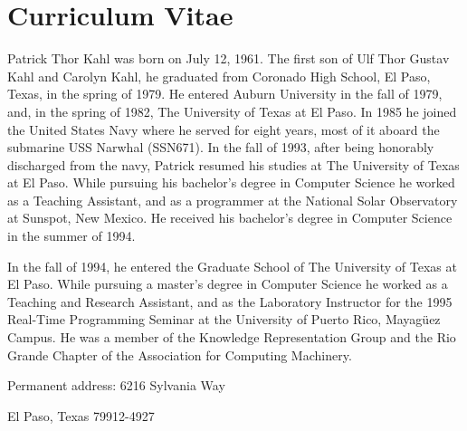 
\chapter*{Curriculum Vitae}

Patrick Thor Kahl was born on July 12, 1961. The first son of Ulf Thor Gustav 
Kahl and Carolyn Kahl, he graduated from Coronado High School, El Paso, Texas, 
in the spring of 1979.  He entered Auburn University in the fall of 1979, and,
in the spring of 1982, The University of Texas at El Paso.  In 1985 he joined
the United States Navy where he served for eight years, most of it aboard the
submarine USS Narwhal (SSN671).  In the fall of 1993, after being honorably
discharged from the navy, Patrick resumed his studies at The University of
Texas at El Paso.  While pursuing his bachelor's degree in Computer Science he
worked as a Teaching Assistant, and as a programmer at the National
Solar Observatory at Sunspot, New Mexico.  He received his bachelor's degree
in Computer Science in the summer of 1994.

In the fall of 1994, he entered the Graduate School of The University of Texas 
at El Paso.  While pursuing a master's degree in Computer Science he worked as 
a Teaching and Research Assistant, and as the Laboratory Instructor for the
1995 Real-Time Programming Seminar at the University of Puerto Rico,
Mayag\"{u}ez Campus.  He was a member of the Knowledge Representation Group
and the Rio Grande Chapter of the Association for Computing Machinery.

\medskip

\noindent
Permanent address: 6216 Sylvania Way

\noindent
\hspace{1.42in}
El Paso, Texas 79912-4927

\vfill



